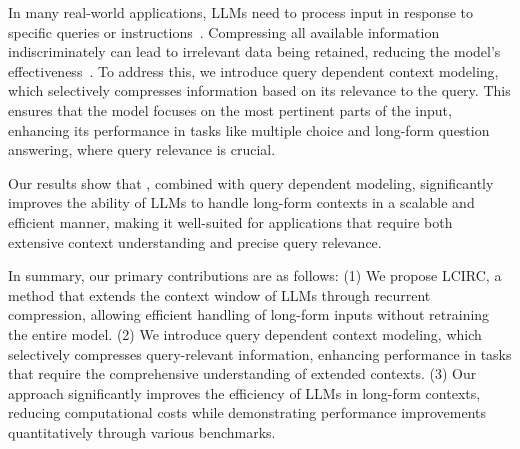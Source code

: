 In many real-world applications, LLMs need to process input in response to specific queries or instructions~\cite{ouyang2022training,naveed2023comprehensive}. Compressing all available information indiscriminately can lead to irrelevant data being retained, reducing the model’s effectiveness~\cite{mulc2024compressing,franceschelli2024training}. To address this, we introduce query dependent context modeling, which selectively compresses information based on its relevance to the query. This ensures that the model focuses on the most pertinent parts of the input, enhancing its performance in tasks like multiple choice and long-form question answering, where query relevance is crucial.

Our results show that \model, combined with query dependent modeling, significantly improves the ability of LLMs to handle long-form contexts in a scalable and efficient manner, making it well-suited for applications that require both extensive context understanding and precise query relevance.

In summary, our primary contributions are as follows: (1) We propose LCIRC, a method that extends the context window of LLMs through recurrent compression, allowing efficient handling of long-form inputs without retraining the entire model. (2) We introduce query dependent context modeling, which selectively compresses query-relevant information, enhancing performance in tasks that require the comprehensive understanding of extended contexts. (3) Our approach significantly improves the efficiency of LLMs in long-form contexts, reducing computational costs while demonstrating performance improvements quantitatively through various benchmarks.




